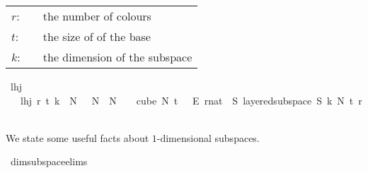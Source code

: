 \begin{isabellebody}
\begin{isamarkuptext}
\begin{tabular}{llp{8cm}}
$r$:& \isa{nat}& the number of colours\\
$t$:& \isa{nat}& the size of of the base\\
$k$:& \isa{nat}& the dimension of the subspace
\end{tabular}%
\end{isamarkuptext}\isamarkuptrue%
\isamarkupfalse%
\ lhj\isanewline
\ \ \ {\isachardoublequoteopen}lhj\ r\ t\ k\ {\isasymequiv}\ {\isacharparenleft}{\kern0pt}{\isasymexists}N\ {\isachargreater}{\kern0pt}\ {}{\isachardot}{\kern0pt}\ {\isasymforall}N{\isacharprime}{\kern0pt}\ {\isasymge}\ N{\isachardot}{\kern0pt}\ {\isasymforall}{\isasymchi}{\isachardot}{\kern0pt}\ {\isasymchi}\ {\isasymin}\ {\isacharparenleft}{\kern0pt}cube\ N{\isacharprime}{\kern0pt}\ {\isacharparenleft}{\kern0pt}t\ {\isacharplus}{\kern0pt}\ {}{\isacharparenright}{\kern0pt}{\isacharparenright}{\kern0pt}\ {\isasymrightarrow}\isactrlsub E\ {\isacharbraceleft}{\kern0pt}{\isachardot}{\kern0pt}{\isachardot}{\kern0pt}{\isacharless}{\kern0pt}r{\isacharcolon}{\kern0pt}{\isacharcolon}{\kern0pt}nat{\isacharbraceright}{\kern0pt}\ {\isasymlongrightarrow}\ {\isacharparenleft}{\kern0pt}{\isasymexists}S{\isachardot}{\kern0pt}\ layered{\isacharunderscore}{\kern0pt}subspace\ S\ k\ N{\isacharprime}{\kern0pt}\ t\ r\ {\isasymchi}{\isacharparenright}{\kern0pt}{\isacharparenright}{\kern0pt}{\isachardoublequoteclose}%
\begin{isamarkuptext}%
We state some useful facts about $1$-dimensional subspaces.%
\end{isamarkuptext}\isamarkuptrue%
\isamarkupfalse%
\ dim{}{\isacharunderscore}{\kern0pt}subspace{\isacharunderscore}{\kern0pt}elims{\isacharcolon}{\kern0pt}\ \isanewline

\end{isabellebody}
